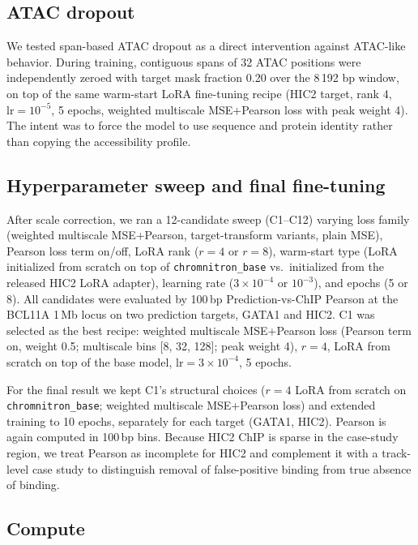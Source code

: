 \documentclass[nohyperref]{article}
\begin{document}
\subsection{ATAC dropout}

We tested span-based ATAC dropout as a direct intervention against ATAC-like behavior. During training, contiguous spans of 32 ATAC positions were independently zeroed with target mask fraction 0.20 over the 8\,192 bp window, on top of the same warm-start LoRA fine-tuning recipe (HIC2 target, rank 4, $\textrm{lr}=10^{-5}$, 5 epochs, weighted multiscale MSE+Pearson loss with peak weight 4). The intent was to force the model to use sequence and protein identity rather than copying the accessibility profile.

\subsection{Hyperparameter sweep and final fine-tuning}

After scale correction, we ran a 12-candidate sweep (C1--C12) varying loss family (weighted multiscale MSE+Pearson, target-transform variants, plain MSE), Pearson loss term on/off, LoRA rank ($r{=}4$ or $r{=}8$), warm-start type (LoRA initialized from scratch on top of \texttt{chromnitron\_base} vs.\ initialized from the released HIC2 LoRA adapter), learning rate ($3{\times}10^{-4}$ or $10^{-3}$), and epochs (5 or 8). All candidates were evaluated by 100\,bp Prediction-vs-ChIP Pearson at the BCL11A 1\,Mb locus on two prediction targets, GATA1 and HIC2. C1 was selected as the best recipe: weighted multiscale MSE+Pearson loss (Pearson term on, weight 0.5; multiscale bins [8, 32, 128]; peak weight 4), $r{=}4$, LoRA from scratch on top of the base model, $\textrm{lr}=3{\times}10^{-4}$, 5 epochs.

For the final result we kept C1's structural choices ($r{=}4$ LoRA from scratch on \texttt{chromnitron\_base}; weighted multiscale MSE+Pearson loss) and extended training to 10 epochs, separately for each target (GATA1, HIC2). Pearson is again computed in 100\,bp bins. Because HIC2 ChIP is sparse in the case-study region, we treat Pearson as incomplete for HIC2 and complement it with a track-level case study to distinguish removal of false-positive binding from true absence of binding.

\subsection{Compute}
\end{document}
